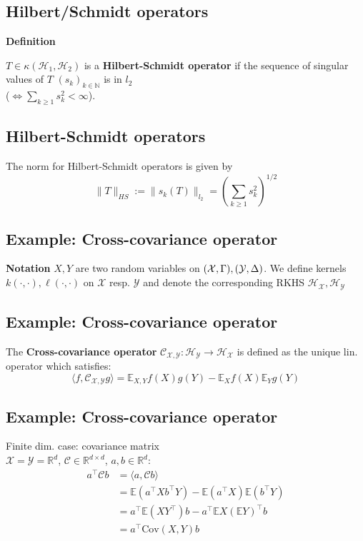 \clearpage

\subsection*{Hilbert\-/Schmidt operators}
\textbf{Definition}

$T\in\kappa(\mathcal{H}_1,\mathcal{H}_2)$ is a \textbf{Hilbert-Schmidt operator} if the sequence of singular values of $T$ $(s_k)_{k\in\mathbb{N}}$ is in $l_2$\\ ($\Leftrightarrow\sum_{k\geq1}s_k^2<\infty$).

\clearpage

\subsection*{Hilbert-Schmidt operators}
The norm for Hilbert-Schmidt operators is given by
\begin{equation*}
\|T\|_{HS}:=\|s_k(T)\|_{l_2}=(\sum_{k\geq1}s^2_k)^{1/2}
\end{equation*}

\clearpage

\subsection*{Example: Cross-covariance operator}
\textbf{Notation}
$X,Y$ are two random variables on $(\mathcal{X},\Gamma),\\(\mathcal{Y},\Delta)$. We define kernels $k(\cdot,\cdot),\ell(\cdot,\cdot)$ on $\mathcal{X}$ resp. $\mathcal{Y}$ and denote the corresponding RKHS $\mathcal{H}_{\mathcal{X}},\mathcal{H}_{\mathcal{Y}}$

\clearpage

\subsection*{Example: Cross-covariance operator}
The \textbf{Cross-covariance operator} $\mathcal{C}_{\mathcal{X},\mathcal{Y}}: \mathcal{H}_{\mathcal{Y}}\rightarrow\mathcal{H}_{\mathcal{X}}$ is defined as the unique lin. operator which satisfies:
\begin{equation*}
\langle f,\mathcal{C}_{\mathcal{X},\mathcal{Y}}g\rangle=\mathbb{E}_{X,Y}f(X)g(Y)-\mathbb{E}_{X}f(X)\mathbb{E}_{Y}g(Y)
\end{equation*}

\clearpage
\subsection*{Example: Cross-covariance operator}
Finite dim. case: covariance matrix \\$\mathcal{X}=\mathcal{Y}=\mathbb{R}^d$, $\mathcal{C}\in\mathbb{R}^{d\times d}$, $a,b\in\mathbb{R}^d$:
\begin{align*}
a^\top\mathcal C b&=\langle a,\mathcal{C}b\rangle\\&=\mathbb{E}(a^\top X b^\top Y)-\mathbb{E}(a^\top X)\mathbb{E}(b^\top Y)\\&=a^\top\mathbb{E}(XY^\top)b-a^\top\mathbb{E}X(\mathbb{E}Y)^\top b\\&=a^\top \text{Cov}(X,Y)b
\end{align*}


